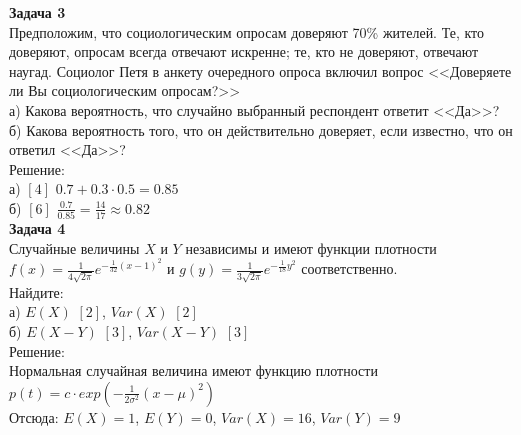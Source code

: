 \documentclass[pdftex,12pt,a4paper]{article}
\begin{document}



\textbf{Задача 3} \\ %
Предположим, что социологическим опросам доверяют 70\% жителей. Те, кто доверяют, опросам всегда отвечают искренне; те, кто не доверяют, отвечают наугад. Социолог Петя  в анкету очередного опроса включил вопрос <<Доверяете ли Вы социологическим опросам?>> \\
а) Какова вероятность, что случайно выбранный респондент ответит <<Да>>? \\
б) Какова вероятность того, что он действительно доверяет, если известно, что он ответил <<Да>>? \\
Решение: \\
а) $[4]$ $0.7+0.3\cdot0.5=0.85$ \\
б) $[6]$ $\frac{0.7}{0.85}=\frac{14}{17}\approx 0.82$ \\


\textbf{Задача 4} \\
Случайные величины $X$ и $Y$ независимы и имеют функции плотности $f(x)=\frac{1}{4\sqrt{2\pi } } e^{-\frac{1}{32} (x-1)^{2} }$ и $g(y)=\frac{1}{3\sqrt{2\pi } } e^{-\frac{1}{18} y^{2} }$ соответственно. \\
Найдите: \\
а) $E(X)$ $[2]$, $Var(X)$ $[2]$ \\
б) $E(X-Y)$ $[3]$, $Var(X-Y)$ $[3]$ \\
Решение: \\
Нормальная случайная величина имеют функцию плотности $p(t)=c\cdot exp(-\frac{1}{2\sigma^{2}}(x-\mu)^{2})$ \\
Отсюда: $E(X)=1$, $E(Y)=0$, $Var(X)=16$, $Var(Y)=9$ \\


\end{document}
